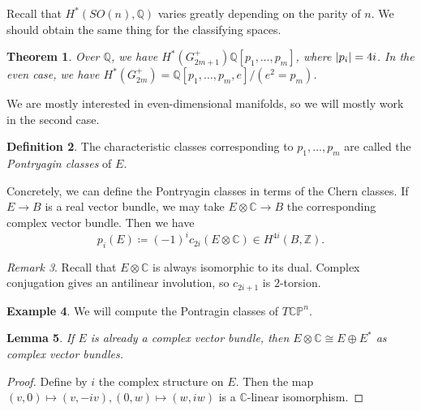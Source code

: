 \documentclass[leqno, openany]{memoir}
\newtheorem{thm}{Theorem}[section]
\newtheorem{lem}[thm]{Lemma}
\theoremstyle{definition}
\newtheorem{defn}[thm]{Definition}
\newtheorem{exm}[thm]{Example}
\theoremstyle{remark}
\newtheorem{rmk}[thm]{Remark}
\theoremstyle{plain}
\theoremstyle{definition}
\theoremstyle{remark}
\newcommand{\C}{\mathbb{C}}
\newcommand{\Z}{\mathbb{Z}}
\newcommand{\Q}{\mathbb{Q}}
\renewcommand{\P}{\mathbb{P}}
\begin{document}
Recall that $H^*(SO(n), \Q)$ varies greatly depending on the parity of $n$. We should obtain the same thing for the classifying spaces.

\begin{thm}
    Over $\Q$, we have $H^*(G_{2m+1}^+) \Q[p_1, \ldots, p_m]$, where $\abs{p_i} = 4i$. In the even case, we have $H^*(G_{2m}^+) = \Q[p_1, \ldots, p_m, e]/(e^2=p_m)$.
\end{thm}
We are mostly interested in even-dimensional manifolds, so we will mostly work in the second case.

\begin{defn}
    The characteristic classes corresponding to $p_1, \ldots, p_m$ are called the \textit{Pontryagin classes} of $E$. 
\end{defn}

Concretely, we can define the Pontryagin classes in terms of the Chern classes. If $E \to B$ is a real vector bundle, we may take $E \otimes \C \to B$ the corresponding complex vector bundle. Then we have
\[ p_i(E) \coloneqq {(-1)}^i c_{2i}(E \otimes \C) \in H^{4i}(B, \Z). \]

\begin{rmk}
    Recall that $E \otimes \C$ is always isomorphic to its dual. Complex conjugation gives an antilinear involution, so $c_{2i+1}$ is $2$-torsion.
\end{rmk}

\begin{exm}
    We will compute the Pontragin classes of $T\C\P^n$.
\end{exm}

\begin{lem}
    If $E$ is already a complex vector bundle, then $E \otimes \C \cong E \oplus E^*$ as complex vector bundles.
\end{lem}

\begin{proof}
    Define by $i$ the complex structure on $E$. Then the map $(v,0) \mapsto (v,-iv), (0,w) \mapsto (w,iw)$ is a $\C$-linear isomorphism.
\end{proof}
\end{document}

